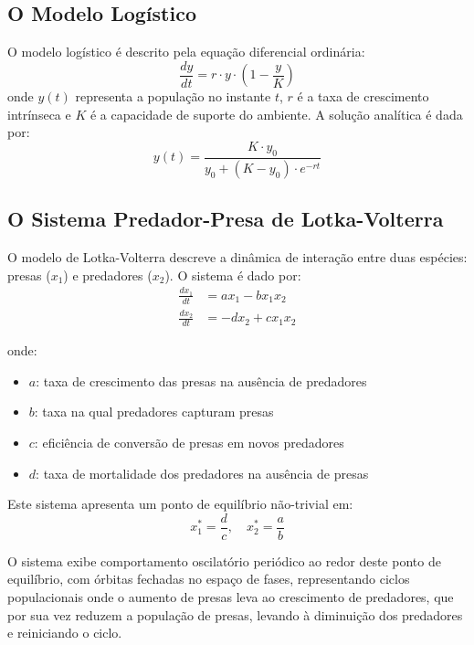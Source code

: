 \documentclass[11pt,a4paper]{article}
\begin{document}
\subsection{O Modelo Logístico}

O modelo logístico é descrito pela equação diferencial ordinária:
\begin{equation}
    \frac{dy}{dt} = r \cdot y \cdot \left(1 - \frac{y}{K}\right)
\end{equation}
onde $y(t)$ representa a população no instante $t$, $r$ é a taxa de crescimento intrínseca e $K$ é a capacidade de suporte do ambiente. A solução analítica é dada por:
\begin{equation}
    y(t) = \frac{K \cdot y_0}{y_0 + (K - y_0) \cdot e^{-rt}}
\end{equation}

\subsection{O Sistema Predador-Presa de Lotka-Volterra}

O modelo de Lotka-Volterra descreve a dinâmica de interação entre duas espécies: presas ($x_1$) e predadores ($x_2$). O sistema é dado por:
\begin{align}
    \frac{dx_1}{dt} &= ax_1 - bx_1x_2 \label{eq:presa}\\
    \frac{dx_2}{dt} &= -dx_2 + cx_1x_2 \label{eq:predador}
\end{align}

onde:
\begin{itemize}
    \item $a$: taxa de crescimento das presas na ausência de predadores
    \item $b$: taxa na qual predadores capturam presas
    \item $c$: eficiência de conversão de presas em novos predadores
    \item $d$: taxa de mortalidade dos predadores na ausência de presas
\end{itemize}

Este sistema apresenta um ponto de equilíbrio não-trivial em:
\begin{equation}
    x_1^* = \frac{d}{c}, \quad x_2^* = \frac{a}{b}
\end{equation}

O sistema exibe comportamento oscilatório periódico ao redor deste ponto de equilíbrio, com órbitas fechadas no espaço de fases, representando ciclos populacionais onde o aumento de presas leva ao crescimento de predadores, que por sua vez reduzem a população de presas, levando à diminuição dos predadores e reiniciando o ciclo.
\end{document}
